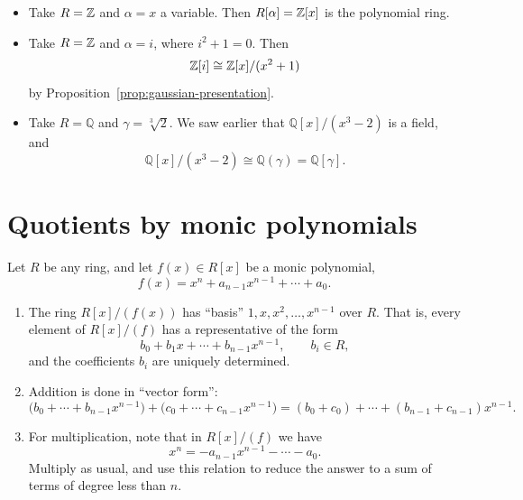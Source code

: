 \documentclass[reqno,11pt]{amsart}
\newcommand{\Q}{\mathbb{Q}}
\begin{document}
\begin{example}
\leavevmode
\begin{itemize}
  \item Take $R=\mathbb{Z}$ and $\alpha=x$ a variable. Then $R[\alpha]=\mathbb{Z}[x]$
    is the polynomial ring.
  \item Take $R=\mathbb{Z}$ and $\alpha=i$, where $i^2+1=0$. Then
    \[
      \mathbb{Z}[i]\cong\mathbb{Z}[x]/(x^2+1)
    \]
    by Proposition~\ref{prop:gaussian-presentation}.
  \item Take $R=\Q$ and $\gamma=\sqrt[3]{2}$. We saw earlier that
    $\Q[x]/(x^3-2)$ is a field, and
    \[
      \Q[x]/(x^3-2)\cong\Q(\gamma)=\Q[\gamma].
    \]
\end{itemize}
\end{example}

\section{Quotients by monic polynomials}

Let $R$ be any ring, and let $f(x)\in R[x]$ be a monic polynomial,
\[
  f(x)=x^n+a_{n-1}x^{n-1}+\cdots+a_0.
\]

\begin{theorem}\label{thm:monic-quotient}
\leavevmode
\begin{enumerate}[label=(\arabic*)]
  \item The ring $R[x]/(f(x))$ has ``basis'' $1,x,x^2,\dots,x^{n-1}$
    over $R$. That is, every element of $R[x]/(f)$ has a
    representative of the form
    \[
      b_0+b_1x+\cdots+b_{n-1}x^{n-1},\qquad b_i\in R,
    \]
    and the coefficients $b_i$ are uniquely determined.
  \item Addition is done in ``vector form'':
    \[
      \bigl(b_0+\cdots+b_{n-1}x^{n-1}\bigr)
      +\bigl(c_0+\cdots+c_{n-1}x^{n-1}\bigr)
      =(b_0+c_0)+\cdots+(b_{n-1}+c_{n-1})x^{n-1}.
    \]
  \item For multiplication, note that in $R[x]/(f)$ we have
    \[
      x^n=-a_{n-1}x^{n-1}-\cdots-a_0.
    \]
    Multiply as usual, and use this relation to reduce the answer to
    a sum of terms of degree less than $n$.
\end{enumerate}
\end{theorem}
\end{document}
